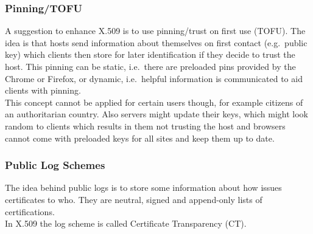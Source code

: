 \subsubsection{Pinning/TOFU}
A suggestion to enhance X.509 is to use pinning/trust on first use (TOFU).
The idea is that hosts send information about themselves on first contact (e.g.\ public key) which clients then store for later identification if they decide to trust the host.
This pinning can be static, i.e.\ there are preloaded pins provided by the Chrome or Firefox, or dynamic, i.e.\ helpful information is communicated to aid clients with pinning.\\
This concept cannot be applied for certain users though, for example citizens of an authoritarian country.
Also servers might update their keys, which might look random to clients which results in them not trusting the host and browsers cannot come with preloaded keys for all sites and keep them up to date.

\subsubsection{Public Log Schemes}
The idea behind public logs is to store some information about how issues certificates to who.
They are neutral, signed and append-only lists of certifications.\\

In X.509 the log scheme is called Certificate Transparency (CT).
